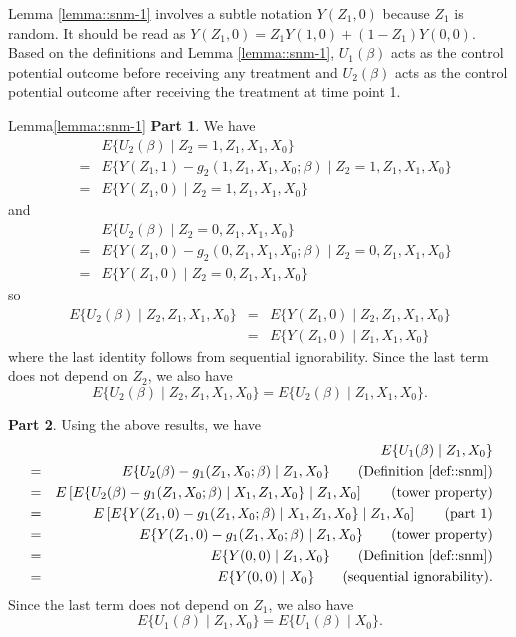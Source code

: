 Lemma \ref{lemma::snm-1} involves a subtle  notation $ Y(Z_1,0) $ because $Z_1$ is random. It should be read as $  Y(Z_1,0) = Z_1 Y(1,0) +(1-Z_1) Y(0,0)$.
Based on the definitions and Lemma \ref{lemma::snm-1}, 
$U_1(\beta)$ acts as the control potential outcome before receiving any treatment and $U_2(\beta)  $ acts as the control potential outcome after receiving the treatment at time point 1. 


\begin{myproof}{Lemma}{\ref{lemma::snm-1}}
{\bf Part 1}. 
We have
\begin{eqnarray*}
&&E\{  U_2(\beta)  \mid Z_2=1, Z_1, X_1, X_0 \}  \\
&=&    E\{  Y(Z_1,1)- g_2(1, Z_1, X_1, X_0;\beta)   \mid Z_2=1, Z_1, X_1, X_0 \}  \\
&=& E\{  Y(Z_1,0)   \mid Z_2=1, Z_1, X_1, X_0 \} 
\end{eqnarray*}
and
\begin{eqnarray*}
&&E\{  U_2(\beta)  \mid Z_2=0, Z_1, X_1, X_0 \} \\
 &=&    E\{  Y(Z_1,0)- g_2(0, Z_1, X_1, X_0;\beta)   \mid Z_2=0, Z_1, X_1, X_0 \}   \\
&=& E\{  Y(Z_1,0)   \mid Z_2=0, Z_1, X_1, X_0 \}
\end{eqnarray*}
so
\begin{eqnarray*}
E\{  U_2(\beta)  \mid Z_2, Z_1, X_1, X_0 \}  &=&  E\{  Y(Z_1,0)   \mid Z_2, Z_1, X_1, X_0 \} \\
&=& E\{  Y(Z_1,0)   \mid   Z_1, X_1, X_0 \}
\end{eqnarray*}
where the last identity follows from sequential ignorability. Since the last term does not depend on $Z_2$, we also have
$$
E\{  U_2(\beta)  \mid Z_2, Z_1, X_1, X_0 \}  = E\{  U_2(\beta)  \mid  Z_1, X_1, X_0 \} . 
$$

{\bf Part 2}. 
Using the above results, we have
 \begin{eqnarray*}
&&E\{  U_1(\beta)  \mid  Z_1, X_0 \}  \\
&=&  E\{  U_2(\beta)  - g_1( Z_1, X_0;\beta)  \mid  Z_1, X_0 \} \qquad (\text{Definition } \ref{def::snm}) \\
&=& E\left[    E\{  U_2(\beta)  - g_1( Z_1, X_0;\beta)  \mid X_1,  Z_1, X_0 \}   \mid  Z_1, X_0 \right]  \qquad (\text{tower property})  \\
&=&  E\left[    E\{ Y(Z_1,0) - g_1( Z_1, X_0;\beta)  \mid X_1,  Z_1, X_0 \}   \mid  Z_1, X_0 \right]   \qquad (\text{part 1}) \\
&=&  E\{ Y(Z_1,0) - g_1( Z_1, X_0;\beta)  \mid  Z_1, X_0 \} \qquad (\text{tower property})  \\
&=& E\{ Y(0,0)  \mid  Z_1, X_0 \} \qquad (\text{Definition } \ref{def::snm}) \\
&=&  E\{ Y(0,0)  \mid  X_0 \}  \qquad (\text{sequential ignorability}).
\end{eqnarray*}
Since the last term does not depend on $Z_1$, we also have
$$
E\{  U_1(\beta)  \mid  Z_1, X_0 \}   = E\{  U_1(\beta)  \mid   X_0 \}.   
$$
\end{myproof}


